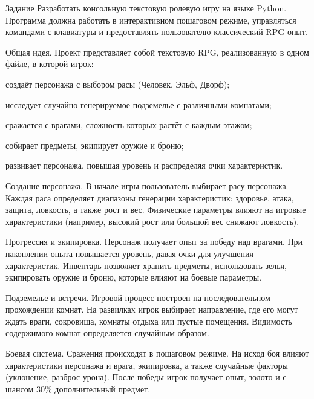 \documentclass[]{vvsu}
\begin{document}
\begin{addition}{Задание}
  Разработать консольную текстовую ролевую игру на языке Python. Программа должна работать в интерактивном пошаговом режиме, управляться командами с клавиатуры и предоставлять пользователю классический RPG-опыт.

  Общая идея. Проект представляет собой текстовую RPG, реализованную в одном файле, в которой игрок:
  \begin{vvsu_itemize}
    \item создаёт персонажа с выбором расы (Человек, Эльф, Дворф);
    \item исследует случайно генерируемое подземелье с различными комнатами;
    \item сражается с врагами, сложность которых растёт с каждым этажом;
    \item собирает предметы, экипирует оружие и броню;
    \item развивает персонажа, повышая уровень и распределяя очки характеристик.
  \end{vvsu_itemize}

  Создание персонажа. В начале игры пользователь выбирает расу персонажа. Каждая раса определяет диапазоны генерации характеристик: здоровье, атака, защита, ловкость, а также рост и вес. Физические параметры влияют на игровые характеристики (например, высокий рост или большой вес снижают ловкость).

  Прогрессия и экипировка. Персонаж получает опыт за победу над врагами. При накоплении опыта повышается уровень, давая очки для улучшения характеристик. Инвентарь позволяет хранить предметы, использовать зелья, экипировать оружие и броню, которые влияют на боевые параметры.

  Подземелье и встречи. Игровой процесс построен на последовательном прохождении комнат. На развилках игрок выбирает направление, где его могут ждать враги, сокровища, комнаты отдыха или пустые помещения. Видимость содержимого комнат определяется случайным образом.

  Боевая система. Сражения происходят в пошаговом режиме. На исход боя влияют характеристики персонажа и врага, экипировка, а также случайные факторы (уклонение, разброс урона). После победы игрок получает опыт, золото и с шансом 30\% дополнительный предмет.
\end{addition}
\end{document}
